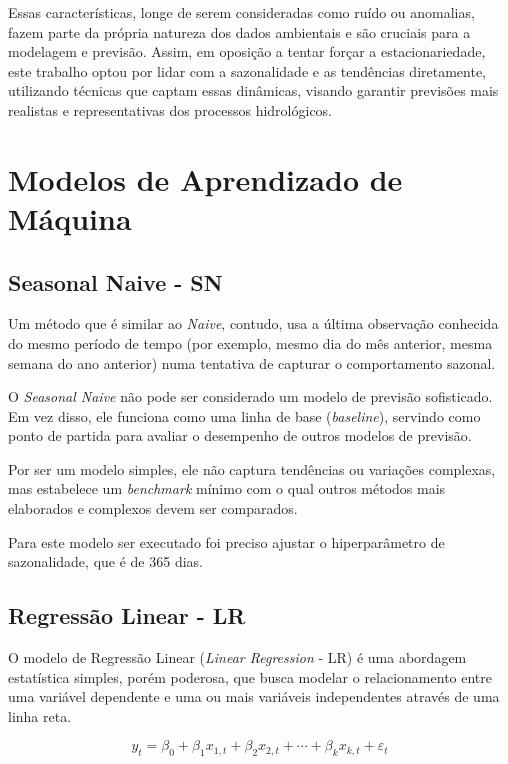 Essas características, longe de serem consideradas como ruído ou anomalias, fazem parte da própria natureza dos dados ambientais e são cruciais para a modelagem e previsão. Assim, em oposição a tentar forçar a estacionariedade, este trabalho optou por lidar com a sazonalidade e as tendências diretamente, utilizando técnicas que captam essas dinâmicas, visando garantir previsões mais realistas e representativas dos processos hidrológicos.

\section{Modelos de Aprendizado de Máquina}

\subsection{Seasonal Naive - SN}

Um método que é similar ao \textit{Naive}, contudo, usa a última observação conhecida do mesmo período de tempo (por exemplo, mesmo dia do mês anterior, mesma semana do ano anterior) numa tentativa de capturar o comportamento sazonal.

O \textit{Seasonal Naive} não pode ser considerado um modelo de previsão sofisticado. Em vez disso, ele funciona como uma linha de base (\textit{baseline}), servindo como ponto de partida para avaliar o desempenho de outros modelos de previsão.\cite{hyndman_fpp3_2024d}

Por ser um modelo simples, ele não captura tendências ou variações complexas, mas estabelece um \textit{benchmark} mínimo com o qual outros métodos mais elaborados e complexos devem ser comparados.

Para este modelo ser executado foi preciso ajustar o hiperparâmetro de sazonalidade, que é de 365 dias.

\subsection{Regressão Linear - LR}

O modelo de Regressão Linear (\textit{Linear Regression} - LR) é uma abordagem estatística simples, porém poderosa, que busca modelar o relacionamento entre uma variável dependente e uma ou mais variáveis independentes através de uma linha reta.

\begin{equation}
	y_{t} = \beta_{0} + \beta_{1} x_{1,t} + \beta_{2} x_{2,t} + \cdots +
	\beta_{k} x_{k,t} + \varepsilon_{t}
\end{equation}

